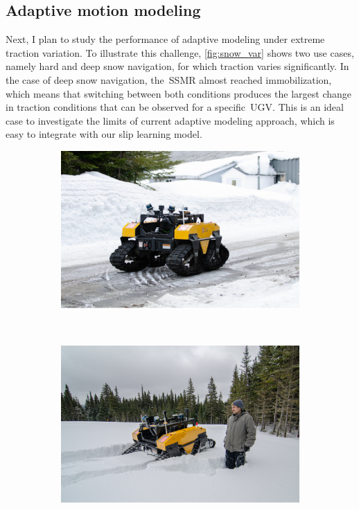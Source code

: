 \documentclass[12pt,letterpaper,oneside]{article}
\begin{document}
\subsection{Adaptive motion modeling}
Next, I plan to study the performance of adaptive modeling under extreme traction variation.
To illustrate this challenge, \autoref{fig:snow_var} shows two use cases, namely hard and deep snow navigation, for which traction varies significantly.
In the case of deep snow navigation, the~\ac{SSMR} almost reached immobilization, which means that switching between both conditions produces the largest change in traction conditions that can be observed for a specific~\ac{UGV}.
This is an ideal case to investigate the limits of current adaptive modeling approach, which is easy to integrate with our slip learning model.
\begin{figure}[h!]
	\begin{center}
		\begin{subfigure}[b]{0.49\textwidth}
			\includegraphics[width=\linewidth]{figs/warthog_hard_snow.pdf}
			\caption{}
			\label{fig:hard_snow}
		\end{subfigure}%
		~
		\begin{subfigure}[b]{0.49\textwidth}
			\includegraphics[width=\linewidth]{figs/snow_depth.pdf}

\end{subfigure}
\end{center}
\end{figure}
\end{document}

